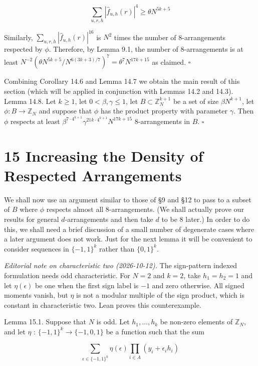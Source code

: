 \documentclass[10pt]{article}
\begin{document}
$$
\sum_{u, r, h}\left|\hat{f}_{u, h}(r)\right|^{4} \geqslant \theta N^{5 k+5}
$$

Similarly, $\sum_{u, r, h}\left|\hat{f}_{u, h}(r)\right|^{16}$ is $N^{2}$ times the number of 8-arrangements respected by $\phi$. Therefore, by Lemma 9.1, the number of 8-arrangements is at least $N^{-2}\left(\theta N^{5 k+5} / N^{6(3 k+3) / 7}\right)^{7}=\theta^{7} N^{17 k+15}$ as claimed. \(\square\)

Combining Corollary 14.6 and Lemma 14.7 we obtain the main result of this section (which will be applied in conjunction with Lemmas 14.2 and 14.3).\\
Lemma 14.8. Let $k\geqslant1$, let $0<\beta,\gamma\leqslant1$, let $B \subset \mathbb{Z}_{N}^{k+1}$ be a set of size $\beta N^{k+1}$, let $\phi: B \rightarrow \mathbb{Z}_{N}$ and suppose that $\phi$ has the product property with parameter $\gamma$. Then $\phi$ respects at least $\beta^{7\cdot4^{k+1}} \gamma^{21k\cdot4^{k+1}} N^{17 k+15}$ 8-arrangements in $B$. \(\square\)

\section*{15 Increasing the Density of Respected Arrangements}
We shall now use an argument similar to those of §9 and §12 to pass to a subset of $B$ where $\phi$ respects almost all 8-arrangements. (We shall actually prove our results for general $d$-arrangements and then take $d$ to be 8 later.) In order to do this, we shall need a brief discussion of a small number of degenerate cases where a later argument does not work. Just for the next lemma it will be convenient to consider sequences in $\{-1,1\}^{k}$ rather than $\{0,1\}^{k}$.

\emph{Editorial note on characteristic two (2026-10-12).}
The sign-pattern indexed formulation needs odd characteristic. For $N=2$
and $k=2$, take $h_1=h_2=1$ and let $\eta(\epsilon)$ be one when the
first sign label is $-1$ and zero otherwise. All signed moments vanish,
but $\eta$ is not a modular multiple of the sign product, which is
constant in characteristic two. Lean proves this counterexample.

Lemma 15.1. Suppose that $N$ is odd. Let $h_{1}, \ldots, h_{k}$ be non-zero elements of $\mathbb{Z}_{N}$, and let $\eta$ : $\{-1,1\}^{k} \rightarrow\{-1,0,1\}$ be a function such that the sum

$$
\sum_{\epsilon \in\{-1,1\}^{k}} \eta(\epsilon) \prod_{i \in A}\left(y_{i}+\epsilon_{i} h_{i}\right)
$$
\end{document}
